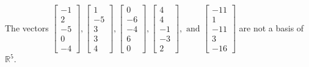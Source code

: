 \begin{exercise}
\begin{exerciseStatement}
  \end{exerciseStatement}
  \begin{exerciseAnswer}
   The vectors \(\left[\begin{array}{r}
-1 \\
2 \\
-5 \\
0 \\
-4
\end{array}\right] , \left[\begin{array}{r}
1 \\
-5 \\
3 \\
3 \\
4
\end{array}\right] , \left[\begin{array}{r}
0 \\
-6 \\
-4 \\
6 \\
0
\end{array}\right] , \left[\begin{array}{r}
4 \\
4 \\
-1 \\
-3 \\
2
\end{array}\right] , \text{ and } \left[\begin{array}{r}
-11 \\
1 \\
-11 \\
3 \\
-16
\end{array}\right]\) 
  	 are not  a basis of \(\mathbb{R}^5\).
  


  \end{exerciseAnswer}
\end{exercise}